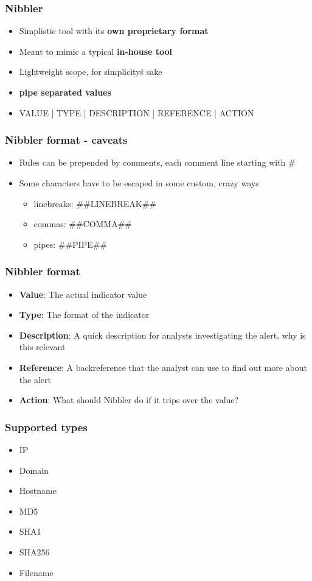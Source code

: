\begin{frame}
  \frametitle{Nibbler}
  \begin{itemize}
    \item Simplistic tool with its {\bf own proprietary format}
    \item Meant to mimic a typical {\bf in-house tool}
    \item Lightweight scope, for simplicity\'s sake
    \item {\bf pipe separated values}
    \item VALUE | TYPE | DESCRIPTION | REFERENCE | ACTION
  \end{itemize}
\end{frame}

\begin{frame}
  \frametitle{Nibbler format - caveats}
  \begin{itemize}
    \item Rules can be prepended by comments, each comment line starting with \#
    \item Some characters have to be escaped in some custom, crazy ways
    \begin{itemize}
       \item linebreaks: \#\#LINEBREAK\#\#
       \item commas: \#\#COMMA\#\#
       \item pipes: \#\#PIPE\#\#
    \end{itemize}
  \end{itemize}
\end{frame}

\begin{frame}
  \frametitle{Nibbler format}
  \begin{itemize}
    \item {\bf Value}: The actual indicator value
    \item {\bf Type}: The format of the indicator
    \item {\bf Description}: A quick description for analysts investigating the alert, why is this relevant
    \item {\bf Reference}: A backreference that the analyst can use to find out more about the alert
    \item {\bf Action}: What should Nibbler do if it trips over the value?
  \end{itemize}
\end{frame}

\begin{frame}
  \frametitle{Supported types}
  \begin{itemize}
    \item IP
    \item Domain
    \item Hostname
    \item MD5
    \item SHA1
    \item SHA256
    \item Filename
  \end{itemize}
\end{frame}

